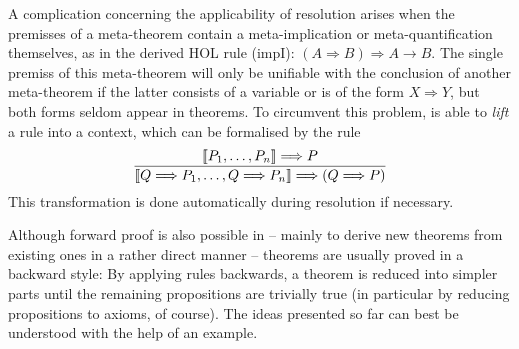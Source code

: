 A complication concerning the applicability of resolution arises when the
premisses of a meta-theorem contain a meta-implication or meta-quantification
themselves, as in the derived HOL rule (impI): $(A \Longrightarrow B) \Longrightarrow A \longrightarrow B$. The single
premiss of this meta-theorem will only be unifiable with the conclusion of
another meta-theorem if the latter consists of a variable or is of the form
$X\Longrightarrow Y$, but both forms seldom appear in theorems.  To circumvent this problem,
\Isabelle is able to \emph{lift} a rule into a context, which can be formalised
by the rule
\begin{equation}
  \frac{\displaystyle \llbracket P_1,\ldots,P_n\rrbracket \Longrightarrow P}{\displaystyle \llbracket Q \Longrightarrow P_1,\ldots,Q\Longrightarrow P_n\rrbracket \Longrightarrow (Q \Longrightarrow P)}
\end{equation}
This transformation is done automatically during resolution if necessary. 

Although forward proof is also possible in \Isabelle -- mainly to derive new
theorems from existing ones in a rather direct manner -- theorems are usually
proved in a backward style: By applying rules backwards, a theorem is reduced
into simpler parts until the remaining propositions are trivially true (in
particular by reducing propositions to axioms, of course).  The ideas presented
so far can best be understood with the help of an example. 

